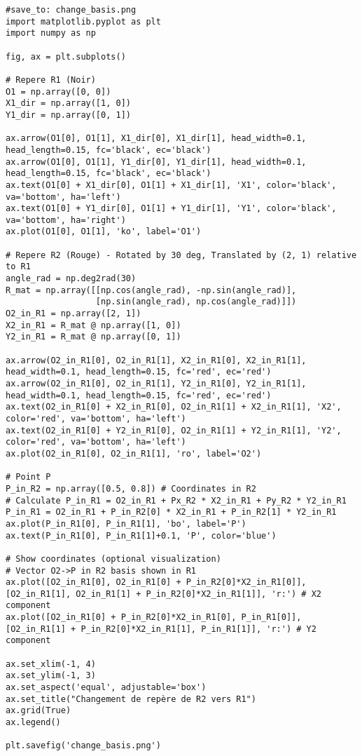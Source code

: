 \documentclass{article}
\begin{document}
\begin{verbatim}
#save_to: change_basis.png
import matplotlib.pyplot as plt
import numpy as np

fig, ax = plt.subplots()

# Repere R1 (Noir)
O1 = np.array([0, 0])
X1_dir = np.array([1, 0])
Y1_dir = np.array([0, 1])

ax.arrow(O1[0], O1[1], X1_dir[0], X1_dir[1], head_width=0.1, head_length=0.15, fc='black', ec='black')
ax.arrow(O1[0], O1[1], Y1_dir[0], Y1_dir[1], head_width=0.1, head_length=0.15, fc='black', ec='black')
ax.text(O1[0] + X1_dir[0], O1[1] + X1_dir[1], 'X1', color='black', va='bottom', ha='left')
ax.text(O1[0] + Y1_dir[0], O1[1] + Y1_dir[1], 'Y1', color='black', va='bottom', ha='right')
ax.plot(O1[0], O1[1], 'ko', label='O1')

# Repere R2 (Rouge) - Rotated by 30 deg, Translated by (2, 1) relative to R1
angle_rad = np.deg2rad(30)
R_mat = np.array([[np.cos(angle_rad), -np.sin(angle_rad)],
                  [np.sin(angle_rad), np.cos(angle_rad)]])
O2_in_R1 = np.array([2, 1])
X2_in_R1 = R_mat @ np.array([1, 0])
Y2_in_R1 = R_mat @ np.array([0, 1])

ax.arrow(O2_in_R1[0], O2_in_R1[1], X2_in_R1[0], X2_in_R1[1], head_width=0.1, head_length=0.15, fc='red', ec='red')
ax.arrow(O2_in_R1[0], O2_in_R1[1], Y2_in_R1[0], Y2_in_R1[1], head_width=0.1, head_length=0.15, fc='red', ec='red')
ax.text(O2_in_R1[0] + X2_in_R1[0], O2_in_R1[1] + X2_in_R1[1], 'X2', color='red', va='bottom', ha='left')
ax.text(O2_in_R1[0] + Y2_in_R1[0], O2_in_R1[1] + Y2_in_R1[1], 'Y2', color='red', va='bottom', ha='left')
ax.plot(O2_in_R1[0], O2_in_R1[1], 'ro', label='O2')

# Point P
P_in_R2 = np.array([0.5, 0.8]) # Coordinates in R2
# Calculate P_in_R1 = O2_in_R1 + Px_R2 * X2_in_R1 + Py_R2 * Y2_in_R1
P_in_R1 = O2_in_R1 + P_in_R2[0] * X2_in_R1 + P_in_R2[1] * Y2_in_R1
ax.plot(P_in_R1[0], P_in_R1[1], 'bo', label='P')
ax.text(P_in_R1[0], P_in_R1[1]+0.1, 'P', color='blue')

# Show coordinates (optional visualization)
# Vector O2->P in R2 basis shown in R1
ax.plot([O2_in_R1[0], O2_in_R1[0] + P_in_R2[0]*X2_in_R1[0]], [O2_in_R1[1], O2_in_R1[1] + P_in_R2[0]*X2_in_R1[1]], 'r:') # X2 component
ax.plot([O2_in_R1[0] + P_in_R2[0]*X2_in_R1[0], P_in_R1[0]], [O2_in_R1[1] + P_in_R2[0]*X2_in_R1[1], P_in_R1[1]], 'r:') # Y2 component

ax.set_xlim(-1, 4)
ax.set_ylim(-1, 3)
ax.set_aspect('equal', adjustable='box')
ax.set_title("Changement de repère de R2 vers R1")
ax.grid(True)
ax.legend()

plt.savefig('change_basis.png')
\end{verbatim}
\end{document}
